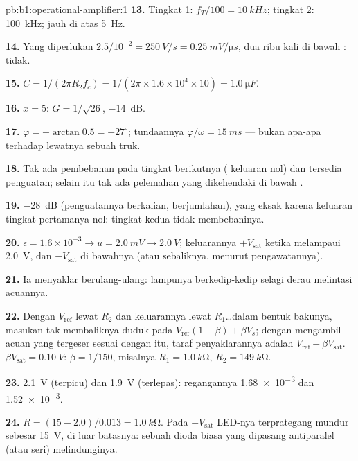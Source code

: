 \begin{solution}{pb:b1:operational-amplifier:1}
\textbf{13.} Tingkat 1: $f_T/100 = \qty{10}{kHz}$; tingkat 2: \qty{100}{kHz};
jauh di atas \qty{5}{Hz}.

\textbf{14.} Yang diperlukan $2.5/10^{-2} = \qty{250}{V/s} = \qty{0.25}{mV/\micro s}$,
dua ribu kali di bawah : tidak.

\textbf{15.} $C = 1/(2\pi R_2f_c) = 1/(2\pi \times 1.6\times10^4 \times 10)
= \qty{1.0}{\micro F}$.

\textbf{16.} $x = 5$: $G = 1/\sqrt{26}$, \qty{-14}{dB}.

\textbf{17.} $\varphi = -\arctan 0.5 = -27^\circ$; tundaannya $\varphi/\omega =
\qty{15}{ms}$ --- bukan apa-apa terhadap lewatnya sebuah truk.

\textbf{18.} Tak ada pembebanan pada tingkat berikutnya (
keluaran nol) dan tersedia penguatan; selain itu tak ada pelemahan
 yang dikehendaki di bawah .

\textbf{19.} \qty{-28}{dB} (penguatannya berkalian, 
berjumlahan), yang eksak karena  keluaran tingkat pertamanya
nol: tingkat kedua tidak membebaninya.

\textbf{20.} $\epsilon = 1.6\times10^{-3} \to u = \qty{2.0}{mV} \to
\qty{2.0}{V}$; keluarannya $+V_{\mathrm{sat}}$ ketika  melampaui
\qty{2.0}{V}, dan $-V_{\mathrm{sat}}$ di bawahnya (atau sebaliknya, menurut pengawatannya).

\textbf{21.} Ia menyaklar berulang-ulang: lampunya berkedip-kedip
selagi derau melintasi acuannya.

\textbf{22.} Dengan $V_{\mathrm{ref}}$ lewat $R_2$ dan keluarannya lewat
$R_1$\dots dalam bentuk bakunya, masukan tak membaliknya duduk pada
$V_{\mathrm{ref}}(1 - \beta) + \beta V_s$; dengan mengambil acuan yang
tergeser sesuai dengan itu, taraf penyaklarannya adalah $V_{\mathrm{ref}} \pm \beta V_{\mathrm{sat}}$.
$\beta V_{\mathrm{sat}} = \qty{0.10}{V}$: $\beta = 1/150$, misalnya $R_1 =
\qty{1.0}{k\ohm}$, $R_2 = \qty{149}{k\ohm}$.

\textbf{23.} \qty{2.1}{V} (terpicu) dan \qty{1.9}{V} (terlepas):
regangannya \num{1.68e-3} dan \num{1.52e-3}.

\textbf{24.} $R = (15 - 2.0)/0.013 = \qty{1.0}{k\ohm}$. Pada
$-V_{\mathrm{sat}}$ LED-nya terprategang mundur sebesar \qty{15}{V}, di
luar batasnya: sebuah dioda biasa yang dipasang antiparalel (atau seri) melindunginya.


\end{solution}
